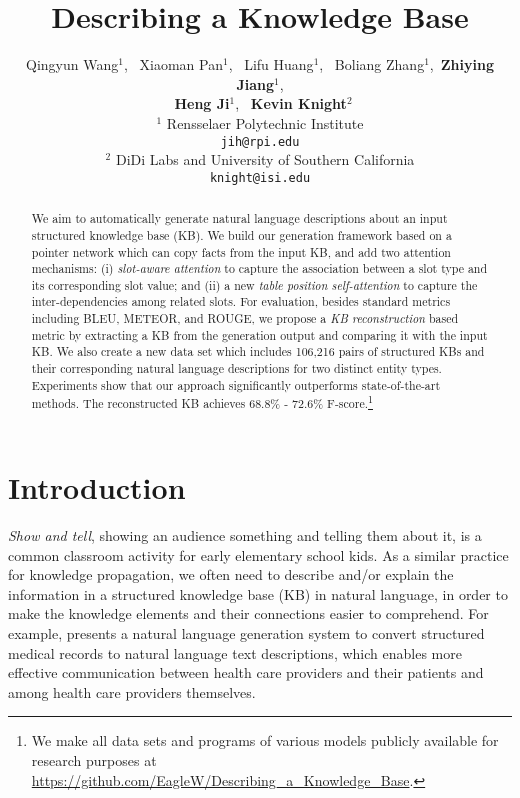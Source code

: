 \documentclass[11pt,a4paper]{article}
\title{Describing a Knowledge Base}
\author{
Qingyun Wang$^{1}$, \ Xiaoman Pan$^{1}$, \ Lifu Huang$^1$, \ Boliang Zhang$^1$,\ \textbf{Zhiying Jiang}$^1$, \\ \ \textbf{Heng Ji}$^1$, \ \textbf{Kevin Knight}$^2$ \\
$^{1}$ Rensselaer Polytechnic Institute \\
{\tt jih@rpi.edu} \\
$^{2}$ DiDi Labs and University of Southern California \\
{\tt knight@isi.edu}
}
\date{}
\begin{document}
\maketitle



\begin{abstract}








We aim to automatically generate natural language descriptions about an input structured knowledge base (KB). We build our generation framework based on a pointer network which can copy facts from the input KB, and add two attention mechanisms: (i) \emph{slot-aware attention} to capture the association between a slot type and its corresponding slot value; and (ii) a new \emph{table position self-attention} to capture the inter-dependencies among related slots. For evaluation, besides standard metrics including BLEU, METEOR, and ROUGE, we propose a \textit{KB reconstruction} based metric by extracting a KB from the generation output and comparing it with the input KB. We also create a new data set which includes 106,216 pairs of structured KBs and their corresponding natural language descriptions for two distinct entity types.
Experiments show that our approach significantly outperforms state-of-the-art methods. The reconstructed KB achieves 68.8\% - 72.6\% F-score.\footnote{We make all data sets and programs of various models publicly available for research purposes at \url{https://github.com/EagleW/Describing_a_Knowledge_Base}.} 





\end{abstract}



 \section{Introduction}
\label{secintro}


\emph{Show and tell}, showing an audience something and telling them about it, is a common classroom activity for early elementary school kids. As a similar practice for knowledge propagation, we often need to describe and/or explain the information in a structured knowledge base (KB) 
in natural language, in order to make the knowledge elements and their connections easier to comprehend. For example, \cite{cawsey1997natural} presents a natural language generation system to convert structured medical records to natural language text descriptions, which enables more effective communication between health care providers and their patients and among health care providers themselves.
\end{document}

